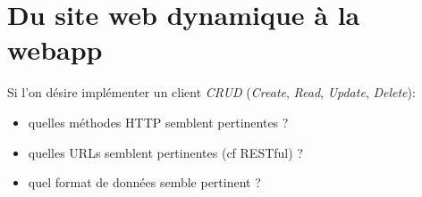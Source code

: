 \documentclass[11pt]{article}
\begin{document}
\section{Du site web dynamique à la webapp}
\label{sec:org33dac4f}

Si l'on désire implémenter un client \emph{CRUD} (\emph{Create}, \emph{Read}, \emph{Update}, \emph{Delete}):

\begin{itemize}
\item quelles méthodes HTTP semblent pertinentes ?
\item quelles URLs semblent pertinentes (cf RESTful) ?
\item quel format de données semble pertinent ?
\end{itemize}
\end{document}
